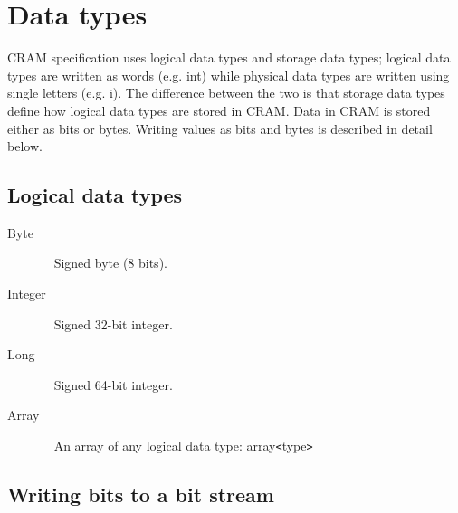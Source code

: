 \documentclass[a4paper]{article}
\begin{document}
\section{\textbf{Data types}}

CRAM specification uses logical data types and storage data types; logical data 
types are written as words (e.g. int) while physical data types are written using 
single letters (e.g. i). The difference between the two is that storage data types 
define how logical data types are stored in CRAM. Data in CRAM is stored either 
as bits or bytes. Writing values as bits and bytes is described in detail 
below.

\subsection{\textbf{Logical data types}}

\begin{description}
\item[Byte]\ \newline
Signed byte (8 bits).

\item[Integer]\ \newline
Signed 32-bit integer. 

\item[Long]\ \newline
Signed 64-bit integer. 

\item[Array]\ \newline
An array of any logical data type: array\texttt{<}type\texttt{>}
\end{description}


\subsection{\textbf{Writing bits to a bit stream}}
\end{document}
